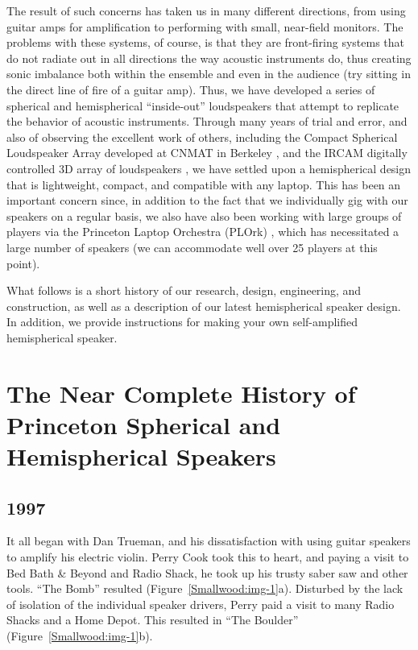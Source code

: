 The result of such concerns has taken us in many different directions, from
using guitar amps for amplification to performing with small, near-field
monitors.  The problems with these systems, of course, is that they are
front-firing systems that do not radiate out in all directions the way acoustic
instruments do, thus creating sonic imbalance both within the ensemble and even
in the audience (try sitting in the direct line of fire of a guitar amp).  Thus,
we have developed a series of spherical and hemispherical ``inside-out''
loudspeakers that attempt to replicate the behavior of acoustic instruments. 
Through many years of trial and error, and also of observing the excellent work
of others, including the Compact Spherical Loudspeaker Array developed at CNMAT
in Berkeley \cite{Avizienis:2006}, and the IRCAM digitally controlled 3D array of loudspeakers \cite{Warusfel:2004},
we have settled upon a hemispherical design that is lightweight, compact, and
compatible with any laptop.  This has been an important concern since, in
addition to the fact that we individually gig with our speakers on a regular
basis, we also have also been working with large groups of players via the
Princeton Laptop Orchestra (PLOrk) \cite{Trueman:2006}, which has necessitated a large number of
speakers (we can accommodate well over 25 players at this point).

What follows is a short history of our research, design, engineering, and
construction, as well as a description of our latest hemispherical speaker
design. In addition, we provide instructions for making your own self-amplified
hemispherical speaker.

\section{The Near Complete History of Princeton  Spherical and Hemispherical Speakers }

\subsection{1997}

It all began with Dan Trueman, and his dissatisfaction with using guitar
speakers to amplify his electric violin. Perry Cook took this to heart, and
paying a visit to Bed Bath \& Beyond and Radio Shack, he took up his trusty saber
saw and other tools. ``The Bomb'' resulted (Figure~\ref{Smallwood:img-1}a). Disturbed by the lack of
isolation of the individual speaker drivers, Perry paid a visit to many Radio
Shacks and a Home Depot. This resulted in ``The Boulder'' (Figure~\ref{Smallwood:img-1}b).

